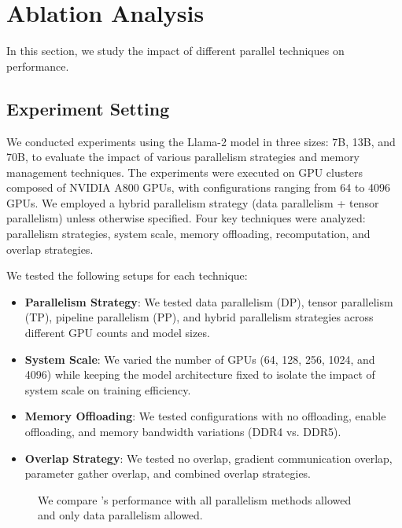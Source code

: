 \section{Ablation Analysis}\label{sec:ablation}

In this section, we study the impact of different parallel techniques on performance.

\subsection{Experiment Setting}

We conducted experiments using the Llama-2 model in three sizes: 7B, 13B, and 70B, to evaluate the impact of various parallelism strategies and memory management techniques. The experiments were executed on GPU clusters composed of NVIDIA A800 GPUs, with configurations ranging from 64 to 4096 GPUs. We employed a hybrid parallelism strategy (data parallelism + tensor parallelism) unless otherwise specified. Four key techniques were analyzed: parallelism strategies, system scale, memory offloading, recomputation, and overlap strategies.

We tested the following setups for each technique:
\begin{itemize}[noitemsep,topsep=1pt, leftmargin=*]
    \item \textbf{Parallelism Strategy}: We tested data parallelism (DP), tensor parallelism (TP), pipeline parallelism (PP), and hybrid parallelism strategies across different GPU counts and model sizes.
    \item \textbf{System Scale}: We varied the number of GPUs (64, 128, 256, 1024, and 4096) while keeping the model architecture fixed to isolate the impact of system scale on training efficiency.
    \item \textbf{Memory Offloading}: We tested configurations with no offloading, enable offloading, and memory bandwidth variations (DDR4 vs. DDR5).
    \item \textbf{Overlap Strategy}: We tested no overlap, gradient communication overlap, parameter gather overlap, and combined overlap strategies.
\end{itemize}

\begin{figure*}[htbp]
  \centering
  \caption{
  We compare \sysname's performance with all parallelism methods allowed and only data parallelism allowed.
  }
  \label{fig:ablation:dp}
\end{figure*}

